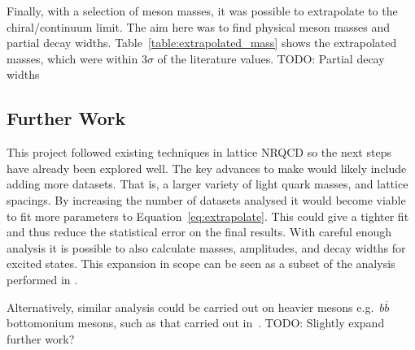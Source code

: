 \documentclass[a4paper,12pt]{article}
\begin{document}
Finally, with a selection of meson masses, it was possible to extrapolate to the chiral/continuum limit. The aim here was to find physical meson masses and partial decay widths. Table~\ref{table:extrapolated_mass} shows the extrapolated masses, which were within $3\sigma$ of the literature values. TODO: Partial decay widths

\subsection{Further Work}
This project followed existing techniques in lattice NRQCD so the next steps have already been explored well. The key advances to make would likely include adding more datasets. That is, a larger variety of light quark masses, and lattice spacings. By increasing the number of datasets analysed it would become viable to fit more parameters to Equation~\ref{eq:extrapolate}. This could give a tighter fit and thus reduce the statistical error on the final results. With careful enough analysis it is possible to also calculate masses, amplitudes, and decay widths for excited states. This expansion in scope can be seen as a subset of the analysis performed in \cite{chakraborty2021improved}.

Alternatively, similar analysis could be carried out on heavier mesons e.g.\ $b\overline{b}$ bottomonium mesons, such as that carried out in~\cite{parrott2020towards}. 
TODO: Slightly expand further work?
\printbibliography{}
\end{document}

